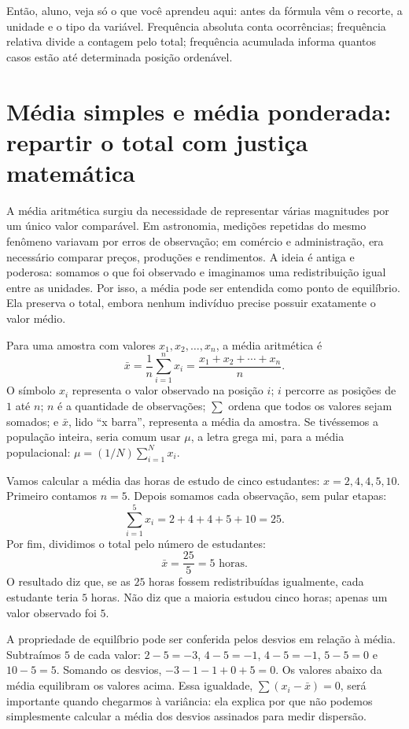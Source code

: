 \begin{SummaryBox}
Então, aluno, veja só o que você aprendeu aqui: antes da fórmula vêm o recorte, a unidade e o tipo da variável. Frequência absoluta conta ocorrências; frequência relativa divide a contagem pelo total; frequência acumulada informa quantos casos estão até determinada posição ordenável.
\end{SummaryBox}

\section{Média simples e média ponderada: repartir o total com justiça matemática}

A média aritmética surgiu da necessidade de representar várias magnitudes por um único valor comparável. Em astronomia, medições repetidas do mesmo fenômeno variavam por erros de observação; em comércio e administração, era necessário comparar preços, produções e rendimentos. A ideia é antiga e poderosa: somamos o que foi observado e imaginamos uma redistribuição igual entre as unidades. Por isso, a média pode ser entendida como ponto de equilíbrio. Ela preserva o total, embora nenhum indivíduo precise possuir exatamente o valor médio.

Para uma amostra com valores $x_1,x_2,\ldots,x_n$, a média aritmética é
\[
 \bar{x}=\frac{1}{n}\sum_{i=1}^{n}x_i
 =\frac{x_1+x_2+\cdots+x_n}{n}.
\]
O símbolo $x_i$ representa o valor observado na posição $i$; $i$ percorre as posições de $1$ até $n$; $n$ é a quantidade de observações; $\sum$ ordena que todos os valores sejam somados; e $\bar{x}$, lido ``x barra'', representa a média da amostra. Se tivéssemos a população inteira, seria comum usar $\mu$, a letra grega mi, para a média populacional: $\mu=(1/N)\sum_{i=1}^{N}x_i$.

Vamos calcular a média das horas de estudo de cinco estudantes: $x={2,4,4,5,10}$. Primeiro contamos $n=5$. Depois somamos cada observação, sem pular etapas:
\[
\sum_{i=1}^{5}x_i=2+4+4+5+10=25.
\]
Por fim, dividimos o total pelo número de estudantes:
\[
\bar{x}=\frac{25}{5}=5\text{ horas}.
\]
O resultado diz que, se as $25$ horas fossem redistribuídas igualmente, cada estudante teria $5$ horas. Não diz que a maioria estudou cinco horas; apenas um valor observado foi $5$.

A propriedade de equilíbrio pode ser conferida pelos desvios em relação à média. Subtraímos $5$ de cada valor: $2-5=-3$, $4-5=-1$, $4-5=-1$, $5-5=0$ e $10-5=5$. Somando os desvios, $-3-1-1+0+5=0$. Os valores abaixo da média equilibram os valores acima. Essa igualdade, $\sum(x_i-\bar{x})=0$, será importante quando chegarmos à variância: ela explica por que não podemos simplesmente calcular a média dos desvios assinados para medir dispersão.

